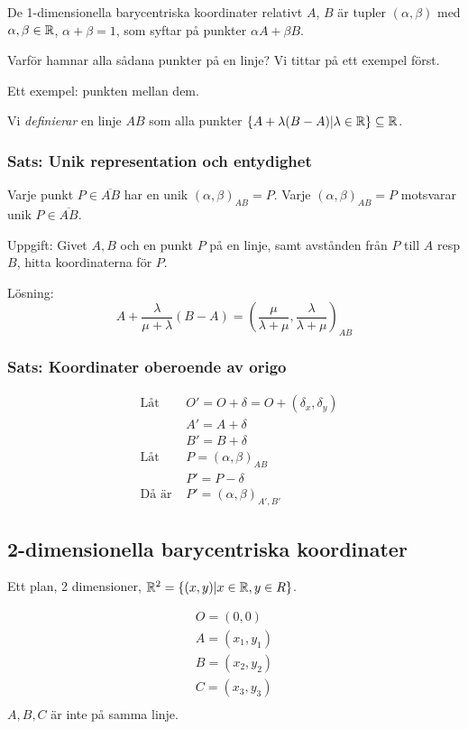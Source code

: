 \documentclass[10pt,a4paper]{article}
\begin{document}
De 1-dimensionella barycentriska koordinater relativt $A$, $B$ är tupler $(\alpha, \beta)$ med $\alpha, \beta \in \mathbb{R}$, $\alpha + \beta = 1$, som syftar på punkter $\alpha A + \beta B$.

Varför hamnar alla sådana punkter på en linje? Vi tittar på ett exempel först.

Ett exempel: punkten mellan dem.

Vi \emph{definierar} en linje $AB$ som alla punkter $\{ A + \lambda (B - A) | \lambda \in \mathbb{R} \} \subseteq \mathbb{R}$.

\subsubsection{Sats: Unik representation och entydighet}
Varje punkt $P \in \overline{AB}$ har en unik $(\alpha, \beta)_{AB} = P$. Varje $(\alpha,\beta)_{AB} = P$ motsvarar unik $P \in \overline{AB}$.


Uppgift: Givet $A,B$ och en punkt $P$ på en linje, samt avstånden från $P$ till $A$ resp $B$, hitta koordinaterna för $P$.

Lösning: 
\[ A + \frac{\lambda}{\mu + \lambda} (B - A) = \left( \frac{\mu}{\lambda + \mu}, \frac{\lambda}{\lambda + \mu} \right)_{AB} \]

\subsubsection{Sats: Koordinater oberoende av origo}

\begin{eqnarray*}
& \text{Låt } & O' = O + \delta = O + (\delta_x, \delta_y) \\
&& A' = A + \delta \\
&& B' = B + \delta \\
& \text{Låt } & P = (\alpha, \beta)_{AB} \\
&& P' = P - \delta \\
& \text{Då är } & P' = (\alpha, \beta)_{A',B'} 
\end{eqnarray*}

\subsection{2-dimensionella barycentriska koordinater}
Ett plan, 2 dimensioner, $\mathbb{R}^2 = \{ (x,y) | x \in \mathbb{R}, y \in R \}$.

\begin{eqnarray*}
O = (0, 0) \\
A = (x_1, y_1) \\
B = (x_2, y_2) \\
C = (x_3, y_3) \\
\end{eqnarray*}
$A, B, C$ är inte på samma linje.
\end{document}
